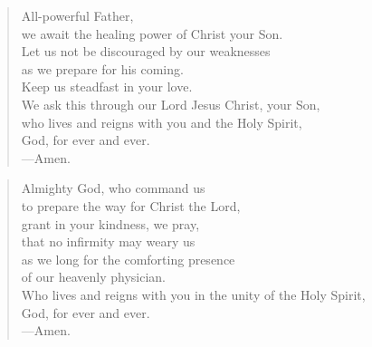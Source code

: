 \prayer

\setlength{\vleftmargin}{\prayerleftmargini}

\begin{verse}
All-powerful Father,\\
we await the healing power of Christ your Son.\\
Let us not be discouraged by our weaknesses\\
as we prepare for his coming.\\
Keep us steadfast in your love.\\
We ask this through our Lord Jesus Christ, your Son,\\
who lives and reigns with you and the Holy Spirit,\\
God, for ever and ever.\\
{\color{red}---\thinspace}Amen.
\end{verse}


\begin{verse}
Almighty God, who command us\\
to prepare the way for Christ the Lord,\\
grant in your kindness, we pray,\\
that no infirmity may weary us\\
as we long for the comforting presence\\
of our heavenly physician.\\
Who lives and reigns with you in the unity of the Holy Spirit,\\
God, for ever and ever.\\
{\color{red}---\thinspace}Amen.
\end{verse}

\setlength{\vleftmargin}{\defleftmargini}